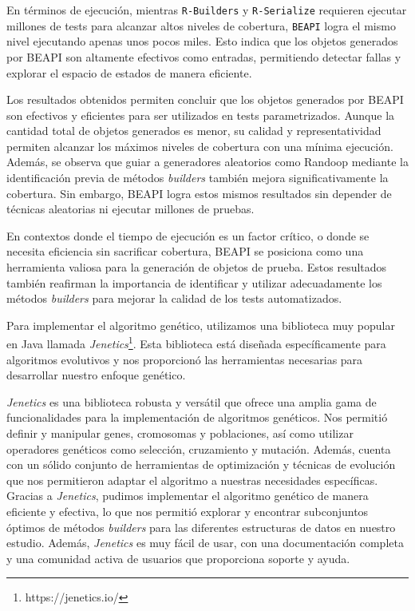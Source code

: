 En términos de ejecución, mientras \texttt{R-Builders} y \texttt{R-Serialize} requieren ejecutar 
millones de tests para alcanzar altos niveles de cobertura, \texttt{BEAPI} logra el mismo nivel 
ejecutando apenas unos pocos miles. Esto indica que los objetos generados por \textsf{BEAPI} son 
altamente efectivos como entradas, permitiendo detectar fallas y explorar el espacio de estados 
de manera eficiente.

Los resultados obtenidos permiten concluir que los objetos generados por \textsf{BEAPI} son 
efectivos y eficientes para ser utilizados en tests parametrizados. Aunque la cantidad total de 
objetos generados es menor, su calidad y representatividad permiten alcanzar los máximos niveles 
de cobertura con una mínima ejecución. Además, se observa que guiar a generadores aleatorios como 
Randoop mediante la identificación previa de métodos \emph{builders} también mejora significativamente 
la cobertura. Sin embargo, \textsf{BEAPI} logra estos mismos resultados sin depender de técnicas 
aleatorias ni ejecutar millones de pruebas.

En contextos donde el tiempo de ejecución es un factor crítico, o donde se necesita eficiencia sin 
sacrificar cobertura, \textsf{BEAPI} se posiciona como una herramienta valiosa para la generación 
de objetos de prueba. Estos resultados también reafirman la importancia de identificar y utilizar 
adecuadamente los métodos \emph{builders} para mejorar la calidad de los tests automatizados.













Para implementar el algoritmo genético, utilizamos una biblioteca muy popular en Java llamada \emph{Jenetics}\footnote{https://jenetics.io/}. Esta biblioteca está diseñada específicamente para algoritmos evolutivos y nos proporcionó las herramientas necesarias para desarrollar nuestro enfoque genético.

\emph{Jenetics} es una biblioteca robusta y versátil que ofrece una amplia gama de funcionalidades para la implementación de algoritmos genéticos. Nos permitió definir y manipular genes, cromosomas y poblaciones, así como utilizar operadores genéticos como selección, cruzamiento y mutación. Además, cuenta con un sólido conjunto de herramientas de optimización y técnicas de evolución que nos permitieron adaptar el algoritmo a nuestras necesidades específicas.
Gracias a \emph{Jenetics}, pudimos implementar el algoritmo genético de manera eficiente y efectiva, lo que nos permitió explorar y encontrar subconjuntos óptimos de métodos \emph{builders} para las diferentes estructuras de datos en nuestro estudio. Además, \emph{Jenetics} es muy fácil de usar, con una documentación completa y una comunidad activa de usuarios que proporciona soporte y ayuda. 


